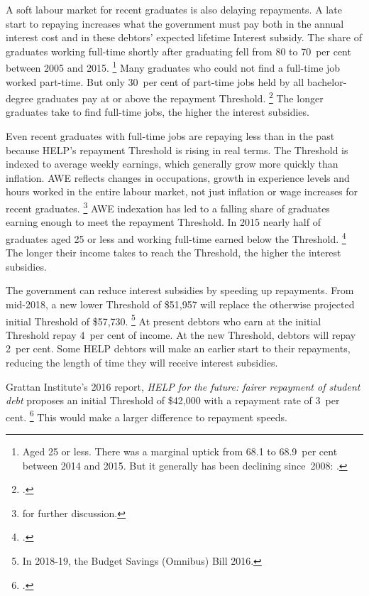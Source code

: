 \documentclass[embargoed]{grattan}
\begin{document}
A soft labour market for recent graduates is also delaying repayments.
A late start to repaying increases what the government must pay both in the annual interest cost and in these debtors' expected lifetime \gls{Interest subsidy}.
The share of graduates working full-time shortly after graduating fell from 80 to 70~per cent between 2005 and 2015.%
\footnote{Aged 25 or less.
There was a marginal uptick from 68.1 to 68.9~per cent between 2014 and 2015.
But it generally has been declining since~2008: \textcite[][Figure~1]{GCA2015GradStatsemploymentsalary}.} Many graduates who could not find a full-time job worked part-time.
But only 30~per cent of part-time jobs held by all bachelor-degree graduates pay at or above the repayment \gls{Threshold}.%
\footcite[][Figure~7]{Norton2016HELPfuturefairer} 
The longer graduates take to find full-time jobs, the higher the interest subsidies.

Even recent graduates with full-time jobs are repaying less than in the past because \gls{HELP}'s repayment \gls{Threshold} is rising in real terms.
The \gls{Threshold} is indexed to average weekly earnings, which generally grow more quickly than inflation.
\gls{AWE} reflects changes in occupations, growth in experience levels and hours worked in the entire labour market, not just inflation or wage increases for recent graduates.%
\footnote{\textcite[][Chapter~8]{Norton2016HELPfuturefairer} for further discussion.} \gls{AWE} indexation has led to a falling share of graduates earning enough to meet the repayment \gls{Threshold}.
In 2015 nearly half of graduates aged 25 or less and working full-time earned below the \gls{Threshold}.%
\footcite{GCA2015GradStatsemploymentsalary} 
The longer their income takes to reach the \gls{Threshold}, the higher the interest subsidies.

The government can reduce interest subsidies by speeding up repayments.
From mid-2018, a new lower \gls{Threshold} of \$51,957 will replace the otherwise projected initial \gls{Threshold} of \$57,730.%
\footnote{In 2018-19, the Budget Savings (Omnibus) Bill 2016.} 
At present debtors who earn at the initial \gls{Threshold} repay 4~per cent of income.
At the new \gls{Threshold}, debtors will repay 2~per cent.
Some \gls{HELP} debtors will make an earlier start to their repayments, reducing the length of time they will receive interest subsidies.

Grattan Institute's 2016 report, \emph{HELP for the future: fairer repayment of student debt} proposes an initial \gls{Threshold} of \$42,000 with a repayment rate of 3~per cent.%
\footcite{Norton2016HELPfuturefairer} 
This would make a larger difference to repayment speeds.
\end{document}
